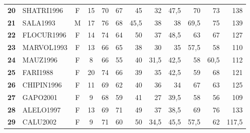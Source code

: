 \begin{landscape}
\begin{table}[p]
\begin{tabular}{>{\bfseries}clcc*{8}{D{,}{,}{3.1}}}
20 & SHATRI1996 & F & 15 & 70 & 67 & 45 & 32 & 47,5 & 70 & 73 & 138 \\
21 & SALA1993 & M & 17 & 76 & 68 & 45,5 & 38 & 38 & 69,5 & 75 & 139 \\
22 & FLOCUR1996 & F & 14 & 74 & 64 & 50 & 37 & 48,5 & 63 & 67 & 127 \\
23 & MARVOL1993 & F & 13 & 66 & 65 & 38 & 30 & 35 & 57,5 & 58 & 110 \\
24 & MAUZ1996 & F & 8 & 66 & 55 & 40 & 31,5 & 42,5 & 58 & 60,5 & 112 \\
25 & FARI1988 & F & 20 & 74 & 66 & 39 & 35 & 42,5 & 59 & 68 & 121 \\
26 & CHIPIN1996 & F & 11 & 69 & 62 & 40 & 36 & 34 & 67 & 63 & 125 \\
27 & GAPO2001 & F & 9 & 68 & 59 & 41 & 27 & 39,5 & 58 & 56 & 109 \\
28 & ALELO1997 & F & 13 & 69 & 71 & 49 & 37 & 38,5 & 69 & 76 & 133 \\
29 & CALU2002 & F & 9 & 71 & 60 & 50 & 34,5 & 45,5 & 57,5 & 62 & 117,5 \\
\bottomrule
\end{tabular}
\end{table}


\end{landscape}
